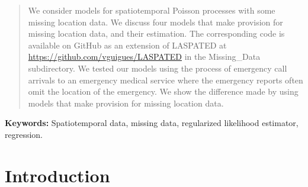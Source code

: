 

\begin{abstract}
We consider models for spatiotemporal Poisson processes with some missing location data.
We discuss four models that make provision for missing location data, and their estimation.
The corresponding code is available on GitHub as an extension of LASPATED at {\url{https://github.com/vguigues/LASPATED}} in the Missing\_Data subdirectory.
We tested our models using the process of emergency call arrivals to an emergency medical service where the emergency reports often omit the location of the emergency.
We show the difference made by using models that make provision for missing location data.
\end{abstract}

\textbf{Keywords:} Spatiotemporal data, missing data, regularized likelihood estimator, regression.

\section{Introduction}

